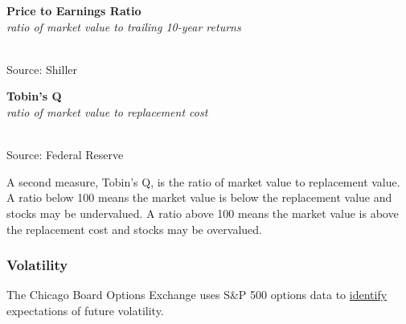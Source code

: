 \documentclass{report}
\makeatletter
\newcommand{\tbllink}[1]{\href{https://raw.githubusercontent.com/bdecon/US-chartbook/master/chartbook/data/#1}{\faTable}}
\newcommand*\short[1]{\expandafter\@gobbletwo\number\numexpr#1\relax}
\newcommand{\shdateaxisticks}{
		date coordinates in=x, axis line style={draw=none},
		xmax={2023-02-15},
		max space between ticks=40,	    
		xtick={{1990-01-01}, {1995-01-01}, {2000-01-01}, 
			{2005-01-01}, {2010-01-01}, {2015-01-01}, {2020-01-01}},
		minor xtick={},
		enlarge y limits={0.06}, enlarge x limits={0.01},
		}
\newcommand{\bbar}[2]{extra #1 ticks = {{#2}}, extra #1 tick labels = ,
		extra #1 tick style = {grid=major, grid style={thick, black!25}},}
\newcommand{\stdline}[4]{\addplot[very thick, no markers, color=#1] 
		table [x=#2, y=#3, col sep=comma] {#4};	}
\newcommand{\rbars}{
		\fill[color=black!10] (axis cs:{1990-07-01},\pgfkeysvalueof{/pgfplots/ymin}) rectangle 
			(axis cs:{1991-03-01}, \pgfkeysvalueof{/pgfplots/ymax});
		\fill[color=black!10] (axis cs:{2007-12-01},\pgfkeysvalueof{/pgfplots/ymin}) rectangle 
			(axis cs:{2009-07-01}, \pgfkeysvalueof{/pgfplots/ymax});
		\fill[color=black!10] (axis cs:{2001-03-01},\pgfkeysvalueof{/pgfplots/ymin}) rectangle 
			(axis cs:{2001-11-01}, \pgfkeysvalueof{/pgfplots/ymax});
		\fill[color=black!10] (axis cs:{2020-02-01},\pgfkeysvalueof{/pgfplots/ymin}) rectangle 
			(axis cs:{2020-05-01}, \pgfkeysvalueof{/pgfplots/ymax});}
\makeatother
\begin{document}
{\begin{minipage}{0.76\textwidth}
\begin{minipage}{0.46\textwidth}
\normalsize \textbf{Price to Earnings Ratio}\\
\footnotesize{\textit{ratio of market value to trailing 10-year returns}}\\
\hspace*{-2mm} \\
\footnotesize{Source: Shiller} \hfill \tbllink{catrpe.csv}
\end{minipage} \hfill
\begin{minipage}{0.46\textwidth}
\normalsize \textbf{Tobin's Q}\\
\footnotesize{\textit{ratio of market value to replacement cost}}\\
\hspace*{-2mm} \\
\footnotesize{Source: Federal Reserve} \hfill \tbllink{tobinq.csv}
\end{minipage}
\vspace{1mm}

\small A second measure, Tobin's Q, is the ratio of market value to replacement value. A ratio below 100 means the market value is below the replacement value and stocks may be undervalued. A ratio above 100 means the market value is above the replacement cost and stocks may be overvalued.  

\subsubsection*{Volatility}
\small The Chicago Board Options Exchange uses S\&P 500 options data to \href{http://www.cboe.com/vix}{identify} expectations of future volatility. 
\vspace{1mm}


\end{minipage}}
\end{document}

